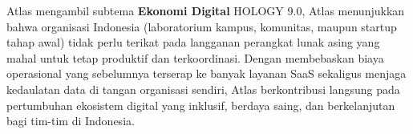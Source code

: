 Atlas mengambil subtema \textbf{Ekonomi Digital} HOLOGY 9.0, Atlas menunjukkan bahwa organisasi Indonesia (laboratorium kampus, komunitas, maupun startup tahap awal) tidak perlu terikat pada langganan perangkat lunak asing yang mahal untuk tetap produktif dan terkoordinasi. Dengan membebaskan biaya operasional yang sebelumnya terserap ke banyak layanan SaaS sekaligus menjaga kedaulatan data di tangan organisasi sendiri, Atlas berkontribusi langsung pada pertumbuhan ekosistem digital yang inklusif, berdaya saing, dan berkelanjutan bagi tim-tim di Indonesia.

\clearpage
